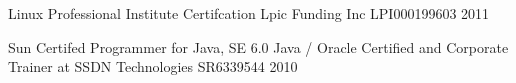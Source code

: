 

\begin{cventries}

  \cventry
    {Linux Professional Institute Certifcation} %
    {Lpic Funding Inc} %
    {LPI000199603} %
    {2011} %
    {}

  \cventry
    {Sun Certifed Programmer for Java, SE 6.0} %
    {Java / Oracle Certified and Corporate Trainer at SSDN Technologies} %
    {SR6339544} %
    {2010} %
    {}

\end{cventries}